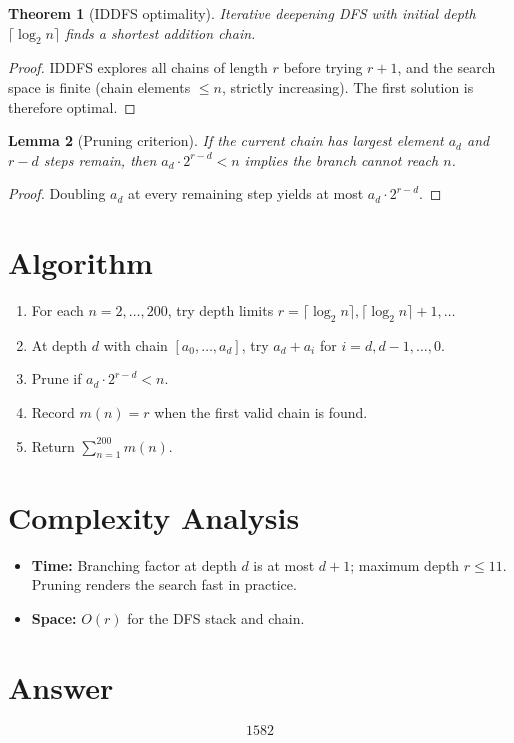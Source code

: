 \documentclass[11pt,a4paper]{article}
\newtheorem{theorem}{Theorem}
\newtheorem{lemma}[theorem]{Lemma}
\begin{document}
\begin{theorem}[IDDFS optimality]
Iterative deepening DFS with initial depth $\lceil \log_2 n \rceil$ finds a shortest addition chain.
\end{theorem}

\begin{proof}
IDDFS explores all chains of length $r$ before trying $r + 1$, and the search space is finite (chain elements $\le n$, strictly increasing). The first solution is therefore optimal.
\end{proof}

\begin{lemma}[Pruning criterion]
If the current chain has largest element $a_d$ and $r - d$ steps remain, then $a_d \cdot 2^{r-d} < n$ implies the branch cannot reach $n$.
\end{lemma}

\begin{proof}
Doubling $a_d$ at every remaining step yields at most $a_d \cdot 2^{r-d}$.
\end{proof}

\section{Algorithm}

\begin{enumerate}
\item For each $n = 2, \ldots, 200$, try depth limits $r = \lceil \log_2 n \rceil, \lceil \log_2 n \rceil + 1, \ldots$
\item At depth $d$ with chain $[a_0, \ldots, a_d]$, try $a_{d} + a_i$ for $i = d, d-1, \ldots, 0$.
\item Prune if $a_d \cdot 2^{r-d} < n$.
\item Record $m(n) = r$ when the first valid chain is found.
\item Return $\sum_{n=1}^{200} m(n)$.
\end{enumerate}

\section{Complexity Analysis}

\begin{itemize}
\item \textbf{Time:} Branching factor at depth $d$ is at most $d + 1$; maximum depth $r \le 11$. Pruning renders the search fast in practice.
\item \textbf{Space:} $O(r)$ for the DFS stack and chain.
\end{itemize}

\section{Answer}

\[
\boxed{1582}
\]
\end{document}
